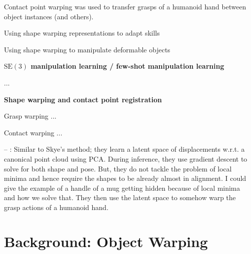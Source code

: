 \documentclass{article}
\begin{document}
Contact point warping was used to transfer grasps of a humanoid hand between object instances \cite{li07DataDriven,benamor12Generalization,hillenbrand12Transferring,jakel12Learning,stouraitis15Functional,rodriguez18Learning,pavlichenko19Autonomous,tian19Transferring} (and others).

Using shape warping representations to adapt skills \cite{brandi14Generalizing}

Using shape warping to manipulate deformable objects \cite{lee15Learning,schulman16Learning}

\textbf{$\mathrm{SE(3)}$ manipulation learning / few-shot manipulation learning}

\cite{wen22You} ...

\textbf{Shape warping and contact point registration}

Grasp warping \citep{li07DataDriven} ...

Contact warping \citep{brandi14Generalizing,hillenbrand12Transferring,jakel12Learning} ...

-- \cite{rodriguez18Transferringa,rodriguez18Transferringb}: Similar to Skye's method; they learn a latent space of displacements w.r.t. a canonical point cloud using PCA. During inference, they use gradient descent to solve for both shape and pose. But, they do not tackle the problem of local minima and hence require the shapes to be already almost in alignment. I could give the example of a handle of a mug getting hidden because of local minima and how we solve that. They then use the latent space to somehow warp the grasp actions of a humanoid hand.

\section{Background: Object Warping}
\end{document}
